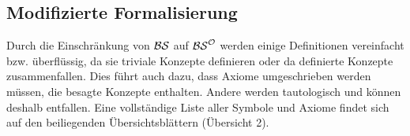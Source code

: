 \subsection{Modifizierte Formalisierung}
Durch die Einschränkung von $\mathcal{BS}$ auf $\mathcal{BS}^{\mathcal{O}}$ werden einige Definitionen vereinfacht bzw. überflüssig, da sie triviale Konzepte definieren oder da definierte Konzepte zusammenfallen.
Dies führt auch dazu, dass Axiome umgeschrieben werden müssen, die besagte Konzepte enthalten. 
Andere werden tautologisch und können deshalb entfallen.
Eine vollständige Liste aller Symbole und Axiome findet sich auf den beiliegenden Übersichtsblättern (Übersicht 2).

